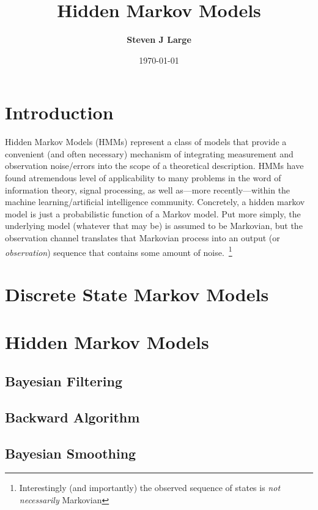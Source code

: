 \documentclass{article}
\title{\tga Hidden Markov Models}
\author{\bf \tga Steven J Large}
\date{\today}
\begin{document}
\maketitle
\tableofcontents
\pagebreak

\twocolumn
\sloppy

\section{Introduction}

Hidden Markov Models (HMMs) represent a class of models that provide a convenient (and often necessary) mechanism of integrating measurement and observation noise/errors into the scope of a theoretical description. HMMs have found atremendous level of applicability to many problems in the word of information theory, signal processing, as well as---more recently---within the machine learning/artificial intelligence community. Concretely, a hidden markov model is just a probabilistic function of a Markov model. Put more simply, the underlying model (whatever that may be) is assumed to be Markovian, but the observation channel translates that Markovian process into an output (or \emph{observation}) sequence that contains some amount of noise.~\footnote{Interestingly (and importantly) the observed sequence of states is \emph{not necessarily} Markovian}



\section{Discrete State Markov Models}

\section{Hidden Markov Models}

\subsection{Bayesian Filtering}

\subsection{Backward Algorithm}

\subsection{Bayesian Smoothing}
\end{document}
